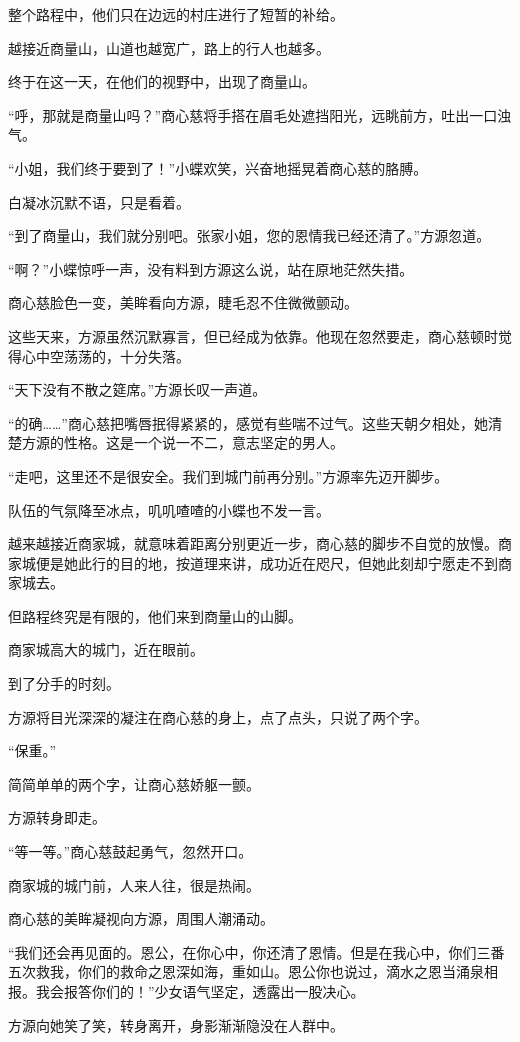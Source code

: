 \begin{this_body}
整个路程中，他们只在边远的村庄进行了短暂的补给。

越接近商量山，山道也越宽广，路上的行人也越多。

终于在这一天，在他们的视野中，出现了商量山。

“呼，那就是商量山吗？”商心慈将手搭在眉毛处遮挡阳光，远眺前方，吐出一口浊气。

“小姐，我们终于要到了！”小蝶欢笑，兴奋地摇晃着商心慈的胳膊。

白凝冰沉默不语，只是看着。

“到了商量山，我们就分别吧。张家小姐，您的恩情我已经还清了。”方源忽道。

“啊？”小蝶惊呼一声，没有料到方源这么说，站在原地茫然失措。

商心慈脸色一变，美眸看向方源，睫毛忍不住微微颤动。

这些天来，方源虽然沉默寡言，但已经成为依靠。他现在忽然要走，商心慈顿时觉得心中空荡荡的，十分失落。

“天下没有不散之筵席。”方源长叹一声道。

“的确……”商心慈把嘴唇抿得紧紧的，感觉有些喘不过气。这些天朝夕相处，她清楚方源的性格。这是一个说一不二，意志坚定的男人。

“走吧，这里还不是很安全。我们到城门前再分别。”方源率先迈开脚步。

队伍的气氛降至冰点，叽叽喳喳的小蝶也不发一言。

越来越接近商家城，就意味着距离分别更近一步，商心慈的脚步不自觉的放慢。商家城便是她此行的目的地，按道理来讲，成功近在咫尺，但她此刻却宁愿走不到商家城去。

但路程终究是有限的，他们来到商量山的山脚。

商家城高大的城门，近在眼前。

到了分手的时刻。

方源将目光深深的凝注在商心慈的身上，点了点头，只说了两个字。

“保重。”

简简单单的两个字，让商心慈娇躯一颤。

方源转身即走。

“等一等。”商心慈鼓起勇气，忽然开口。

商家城的城门前，人来人往，很是热闹。

商心慈的美眸凝视向方源，周围人潮涌动。

“我们还会再见面的。恩公，在你心中，你还清了恩情。但是在我心中，你们三番五次救我，你们的救命之恩深如海，重如山。恩公你也说过，滴水之恩当涌泉相报。我会报答你们的！”少女语气坚定，透露出一股决心。

方源向她笑了笑，转身离开，身影渐渐隐没在人群中。


\end{this_body}
